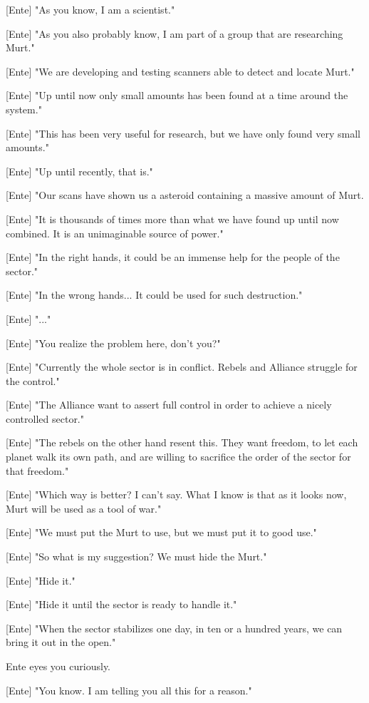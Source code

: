 \documentclass[a4paper,12pt]{article}
\begin{document}
[Ente] "As you know, I am a scientist." 

[Ente] "As you also probably know, I am part of a group that are researching Murt."

[Ente] "We are developing and testing scanners able to detect and locate Murt."

[Ente] "Up until now only small amounts has been found at a time around the system." 

[Ente] "This has been very useful for research, but we have only found very small amounts."

[Ente] "Up until recently, that is." 

[Ente] "Our scans have shown us a asteroid containing a massive amount of Murt. 

[Ente] "It is thousands of times more than what we have found up until now combined. It is an unimaginable source of power."

[Ente] "In the right hands, it could be an immense help for the people of the sector."

[Ente] "In the wrong hands... It could be used for such destruction."

[Ente] "..."

[Ente] "You realize the problem here, don't you?"

[Ente] "Currently the whole sector is in conflict. Rebels and Alliance struggle for the control."

[Ente] "The Alliance want to assert full control in order to achieve a nicely controlled sector."

[Ente] "The rebels on the other hand resent this. They want freedom, to let each planet walk its own path, and
are willing to sacrifice the order of the sector for that freedom."

[Ente] "Which way is better? I can't say. What I know is that as it looks now, Murt will be used as a tool of war."

[Ente] "We must put the Murt to use, but we must put it to good use."

[Ente] "So what is my suggestion? We must hide the Murt." 

[Ente] "Hide it." 

[Ente] "Hide it until the sector is ready to handle it."

[Ente] "When the sector stabilizes one day, in ten or a hundred years, we can bring it out in the open."

Ente eyes you curiously.

[Ente] "You know. I am telling you all this for a reason." 
\end{document}
